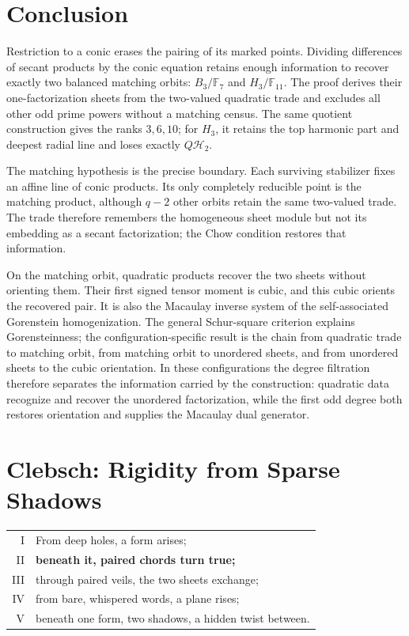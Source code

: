 \documentclass[11pt]{article}
\theoremstyle{definition}
\theoremstyle{remark}
\newcommand{\F}{\mathbb{F}}
\begin{document}
\section{Conclusion}

Restriction to a conic erases the pairing of its marked points.  Dividing
differences of secant products by the conic equation retains enough
information to recover exactly two balanced matching orbits:
\(B_3/\F_7\) and \(H_3/\F_{11}\).  The proof derives their
one-factorization sheets from the two-valued quadratic trade and excludes
all other odd prime powers without a matching census.  The same quotient
construction gives the ranks \(3,6,10\); for \(H_3\), it retains the top
harmonic part and deepest radial line and loses exactly
\(Q\mathcal H_2\).

The matching hypothesis is the precise boundary.  Each surviving
stabilizer fixes an affine line of conic products.  Its only completely
reducible point is the matching product, although \(q-2\) other orbits
retain the same two-valued trade.  The trade therefore remembers the
homogeneous sheet module but not its embedding as a secant factorization;
the Chow condition restores that information.

On the matching orbit, quadratic products recover the two sheets without
orienting them.  Their first signed tensor moment is cubic, and this cubic
orients the recovered pair.  It is also the Macaulay inverse system of the
self-associated Gorenstein homogenization.  The general Schur-square
criterion explains Gorensteinness; the configuration-specific result is
the chain from quadratic trade to matching orbit, from matching orbit to
unordered sheets, and from unordered sheets to the cubic orientation.
In these configurations the degree filtration therefore separates the
information carried by the construction: quadratic data recognize and
recover the unordered factorization, while the first odd degree both
restores orientation and supplies the Macaulay dual generator.

\clearpage
\section*{Clebsch: Rigidity from Sparse Shadows}

\begin{center}
\begin{tabular}{@{}r@{\hskip 1.4em}l@{}}
{\scriptsize I}   & From deep holes, a form arises;\\
{\scriptsize II}  & \textbf{beneath it, paired chords turn true;}\\
{\scriptsize III} & through paired veils, the two sheets exchange;\\
{\scriptsize IV}  & from bare, whispered words, a plane rises;\\
{\scriptsize V}   & beneath one form, two shadows, a hidden twist between.
\end{tabular}
\end{center}
\end{document}
